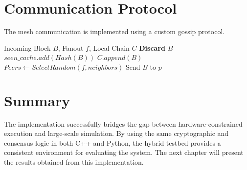 \section{Communication Protocol}

The mesh communication is implemented using a custom gossip protocol.

\begin{algorithm}[H]
\caption{Gossip-based Block Propagation}
\label{alg:gossip}
\begin{algorithmic}[1]
\REQUIRE Incoming Block $B$, Fanout $f$, Local Chain $C$
    \STATE \textbf{Discard} $B$ 
\ELSE
    \STATE $seen\_cache.add(Hash(B))$
        \STATE $C.append(B)$
        \STATE $Peers \leftarrow SelectRandom(f, neighbors)$
            \STATE Send $B$ to $p$
        \ENDFOR
    \ENDIF
\ENDIF
\end{algorithmic}
\end{algorithm}

\section{Summary}

The implementation successfully bridges the gap between hardware-constrained execution and large-scale simulation. By using the same cryptographic and consensus logic in both C++ and Python, the hybrid testbed provides a consistent environment for evaluating the system. The next chapter will present the results obtained from this implementation.